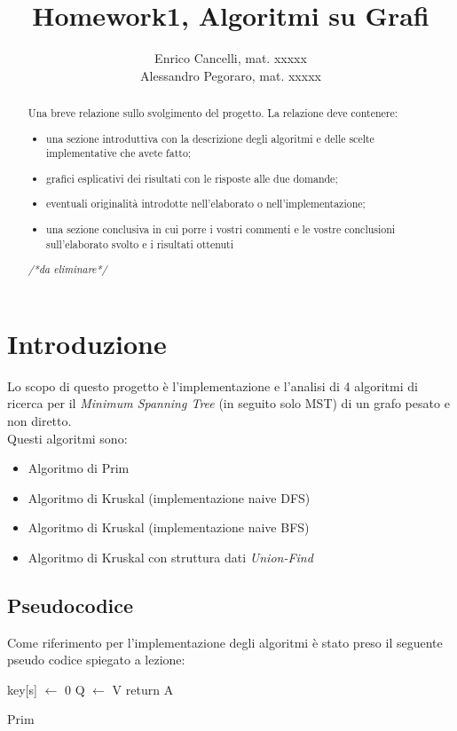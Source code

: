 \documentclass[]{article}
\title{Homework1, Algoritmi su Grafi}
\author{Enrico Cancelli, mat. xxxxx\\
		Alessandro Pegoraro, mat. xxxxx}
\begin{document}
\maketitle

\begin{abstract}
	Una breve relazione sullo svolgimento del progetto. La relazione deve contenere:
	\begin{itemize}
		\item una sezione introduttiva con la descrizione degli algoritmi e delle scelte implementative che avete fatto;
		\item grafici esplicativi dei risultati con le risposte alle due domande;
		\item eventuali originalità introdotte nell'elaborato o nell'implementazione;
		\item una sezione conclusiva in cui porre i vostri commenti e le vostre conclusioni sull'elaborato svolto e i risultati ottenuti
	\end{itemize}
	\textit{/*da eliminare*/}
\end{abstract}

\section{Introduzione}
Lo scopo di questo progetto è l'implementazione e l'analisi di 4 algoritmi di ricerca per il \textit{Minimum Spanning Tree} (in seguito solo MST) di un grafo pesato e non diretto.\\
Questi algoritmi sono:
\begin{itemize}
	\item Algoritmo di Prim
	\item Algoritmo di Kruskal (implementazione naive DFS)
	\item Algoritmo di Kruskal (implementazione naive BFS)
	\item Algoritmo di Kruskal con struttura dati \textit{Union-Find}
\end{itemize}
\subsection{Pseudocodice}
Come riferimento per l'implementazione degli algoritmi è stato preso il seguente pseudo codice spiegato a lezione:\\
\begin{algorithm}[H]
	\SetAlgoLined
	\DontPrintSemicolon
	key[s] $\gets$ 0\;
	Q $\gets$ V\;
	return A\;
	\caption{Prim}
\end{algorithm}
\end{document}
